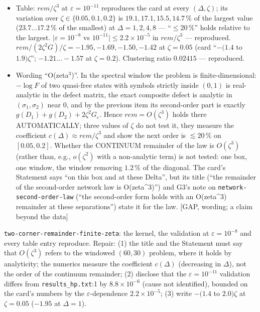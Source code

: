 \documentclass[11pt]{article}
\begin{document}
\begin{itemize}[leftmargin=*]
only for the other window. [MINOR, disclosure]
\item Table: $rem/\zeta^3$ at $\varepsilon=10^{-11}$ reproduces the card at every $(\Delta,\zeta)$; its variation over
$\zeta\in\{0.05,0.1,0.2\}$ is $19.1, 17.1, 15.5, 14.7\,\%$ of the largest value ($23.7\ldots17.2\,\%$ of the smallest) at
$\Delta=1,2,4,8$ --- ``$\le20\,\%$'' holds relative to the largest. $|\varepsilon=10^{-8}$ vs $10^{-11}|\le2.2\times10^{-5}$ in
$rem/\zeta^3$ --- reproduced. $rem/(2\zeta^2G)/\zeta=-1.95,-1.69,-1.50,-1.42$ at $\zeta=0.05$ (card ``$-(1.4$ to $1.9)\zeta$'';
$-1.21\ldots-1.57$ at $\zeta=0.2$). Clustering ratio $0.02415$ --- reproduced.
\item Wording ``O(zeta$^3$)''. In the spectral window the problem is finite-dimensional: $-\log F$ of two quasi-free states
with symbols strictly inside $(0,1)$ is real-analytic in the defect matrix, the exact composite defect is analytic in
$(\sigma_1,\sigma_2)$ near 0, and by the previous item its second-order part is exactly $g(D_1)+g(D_2)+2\zeta^2G_\varepsilon$.
Hence $rem=O(\zeta^3)$ holds there AUTOMATICALLY; three values of $\zeta$ do not test it, they measure the coefficient
$c(\Delta)\approx rem/\zeta^3$ and show the next order is $\lesssim20\,\%$ on $[0.05,0.2]$. Whether the CONTINUUM remainder
of the law is $O(\zeta^3)$ (rather than, e.g., $o(\zeta^2)$ with a non-analytic term) is not tested: one box, one window,
the window removing $1.2\,\%$ of the diagonal. The card's Statement says ``on this box and at these Delta'', but its title
(``the remainder of the second-order network law is O(zeta\^{}3)'') and G3's note on \texttt{network-second-order-law}
(``the second-order form holds with an O(zeta\^{}3) remainder at these separations'') state it for the law. [GAP, wording;
a claim beyond the data]
\end{itemize}

\begin{verdictgap}
\texttt{two-corner-remainder-finite-zeta}: the kernel, the validation at $\varepsilon=10^{-8}$ and every table entry reproduce.
Repair: (1) the title and the Statement must say that $O(\zeta^3)$ refers to the windowed $(60,30)$ problem, where it holds
by analyticity; the numerics measure the coefficient $c(\Delta)$ (decreasing in $\Delta$), not the order of the continuum
remainder; (2) disclose that the $\varepsilon=10^{-11}$ validation differs from \texttt{results\_hp.txt}:1 by $8.8\times10^{-6}$
(cause not identified), bounded on the card's numbers by the $\varepsilon$-dependence $2.2\times10^{-5}$; (3) write
$-(1.4$ to $2.0)\zeta$ at $\zeta=0.05$ ($-1.95$ at $\Delta=1$).
\end{verdictgap}
\end{document}
